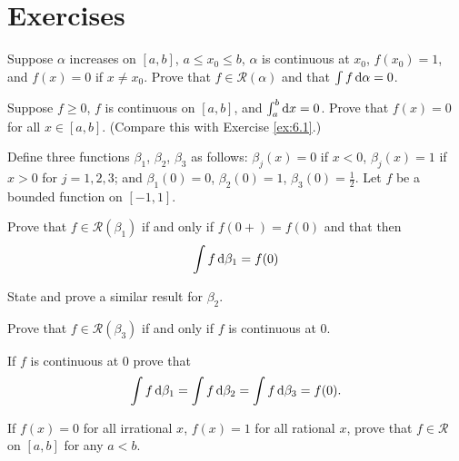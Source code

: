 
\section{Exercises}

\begin{myExercise}
    \label{ex:6.1}
    Suppose $\alpha$ increases on $[a, b]$, $a \leq x_0 \leq b$, 
    $\alpha$ is continuous at $x_0$, $f(x_0) = 1$, and
    $f(x) = 0$ if $x \neq x_0$. 
    Prove that $f \in \mathscr{R}(\alpha)$ and that $\int f \d \alpha = 0$.
\end{myExercise}


\begin{myExercise}
    \label{ex:6.2}
    Suppose $f \geq 0$, 
    $f$ is continuous on $[a, b]$, and
    $\int_{a}^{b} \d x = 0$. 
    Prove that $f(x) = 0$
    for all $x \in [a, b]$. 
    (Compare this with Exercise \ref{ex:6.1}.)
\end{myExercise}


\begin{myExercise}
    \label{ex:6.3}
    Define three functions $\beta_1$, $\beta_2$, $\beta_3$ as follows: 
    $\beta_j(x) = 0$ if $x < 0$, 
    $\beta_j(x) = 1$ if $x > 0$ 
    for $j = 1, 2, 3$; 
    and $\beta_1(0) = 0$, $\beta_2(0) =1$, $\beta_3(0) = \frac{1}{2}$. Let $f$ be a bounded function on $[-1,1]$.
    \begin{asparaenum}[(a)]
        \item Prove that $f \in \mathscr{R}(\beta_1)$ if and only if $f(0+) = f(0)$ and that then 
        \begin{equation*}
            \int f \d \beta_1 = f(0)
        \end{equation*}
        \item State and prove a similar result for $\beta_2$.
        \item Prove that $f \in \mathscr{R}(\beta_3)$ if and only if $f$ is continuous at 0.
        \item If $f$ is continuous at 0 prove that 
        \begin{equation*}
            \int f \d \beta_1 = 
            \int f \d \beta_2 = 
            \int f \d \beta_3 = f(0).
        \end{equation*}
    \end{asparaenum}
\end{myExercise}


\begin{myExercise}
    \label{ex:6.4}
    If $f(x) = 0$ for all irrational $x$,
    $f(x) = 1$ for all rational $x$, 
    prove that $f \in \mathscr{R}$ on $[a, b]$ for any $a < b$.
\end{myExercise}


